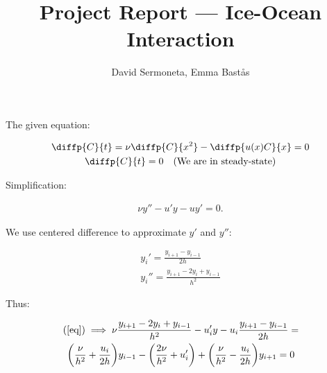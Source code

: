 \documentclass{report}
\title{Project Report — Ice-Ocean Interaction}
\author{David Sermoneta, Emma Bastås}
\begin{document}
\maketitle

The given equation:

\begin{gather*}
  \diffp{C}{t} = \nu \diffp{C}{{x^2}} - \diffp{u(x)C}{x} = 0 \\
  \diffp{C}{t} = 0 \quad \text{(We are in steady-state)} \\
\end{gather*}

Simplification:

\begin{gather}
  \nu y'' - u'y - uy' = 0 \label{eq}\tag{$\star$}\text{.}
\end{gather}

We use centered difference to approximate $y'$ and $y''$:

\begin{gather*}
  y_i' = \frac{y_{i+1} - y_{i-1}}{2h} \\[3pt]
  y_i'' = \frac{y_{i+1} - 2y_i + y_{i-1}}{h^2}
\end{gather*}

Thus:

\begin{gather*}
  \text{(\ref{eq})} \implies
  \nu\frac{y_{i+1} - 2y_i + y_{i-1}}{h^2}
  - u_i'y
  -u_i\frac{y_{i+1} - y_{i-1}}{2h} = \\
  \biggl(\frac{\nu}{h^2} + \frac{u_i}{2h}\biggr)y_{i-1} - \biggl(\frac{2\nu}{h^2} + u_i'\biggr) + \biggl(\frac{\nu}{h^2} - \frac{u_i}{2h}\biggr)y_{i+1} = 0
\end{gather*}
\end{document}
